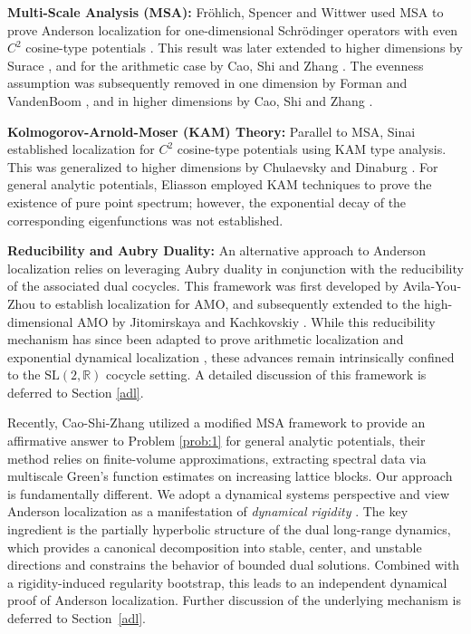 \documentclass[reqno,11pt]{amsart}
\newcommand{\R}{{\mathbb R}}
\begin{document}
\textbf{Multi-Scale Analysis (MSA):} 
Fr\"ohlich, Spencer and Wittwer used MSA to prove Anderson localization for one-dimensional Schr\"odinger operators with even $C^2$ cosine-type potentials \cite{FSW90}. This result was later extended to higher dimensions by Surace \cite{Sur96,Sur90}, and for the arithmetic case by Cao, Shi and Zhang \cite{CSZ23}. The evenness assumption was subsequently removed in one dimension by Forman and VandenBoom \cite{FV21}, and in higher dimensions by Cao, Shi and Zhang \cite{CSZ}.



\textbf{Kolmogorov-Arnold-Moser (KAM) Theory:} Parallel to MSA, Sinai \cite{Sin87} established localization for $C^2$ cosine-type potentials using KAM type analysis. This was generalized to higher dimensions by Chulaevsky and Dinaburg \cite{CD93, D}. For general analytic potentials, Eliasson \cite{Eli97, E} employed KAM techniques to prove the existence of pure point spectrum; however, the exponential decay of the corresponding eigenfunctions was not established.

\textbf{Reducibility and Aubry Duality:} An alternative approach to Anderson localization relies on leveraging Aubry duality in conjunction with the reducibility of the associated dual cocycles. This framework was first  developed by Avila-You-Zhou \cite{AYZ} to establish localization for AMO, and subsequently extended to the high-dimensional AMO by Jitomirskaya and Kachkovskiy \cite{JK}. While this reducibility mechanism has since been adapted to prove arithmetic localization \cite{GY,GYZ24}  and exponential dynamical localization \cite{GYZ23}, these advances remain intrinsically confined to the $\mathrm{SL}(2,\R)$ cocycle setting. A detailed discussion of this  framework is deferred to Section \ref{adl}.



Recently, Cao-Shi-Zhang \cite{CSZ1} utilized a modified MSA framework to provide an affirmative answer to Problem \ref{prob:1} for general analytic potentials,   their method relies on finite-volume approximations, extracting spectral data via multiscale Green's function estimates on increasing lattice blocks.  Our approach is fundamentally different. We adopt a dynamical systems perspective and view Anderson localization as a manifestation of \emph{dynamical rigidity} \cite{Yoccoz}. The key ingredient is the partially hyperbolic structure of the dual long-range dynamics, which provides a canonical decomposition into stable, center, and unstable directions and constrains the behavior of bounded dual solutions. Combined with a rigidity-induced regularity bootstrap, this leads to an independent dynamical proof of Anderson localization. Further discussion of the underlying mechanism is deferred to Section~\ref{adl}.
\end{document}
